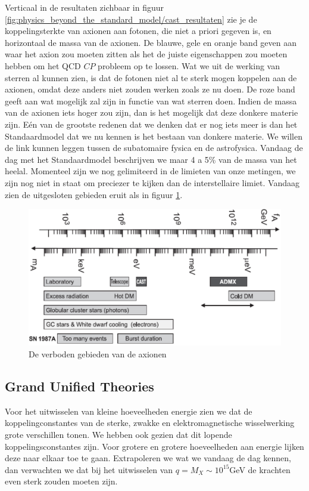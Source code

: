 \documentclass[../main.tex]{subfiles}
\begin{document}
Verticaal in de resultaten zichbaar in figuur \ref{fig:physics_beyond_the_standard_model/cast_resultaten} zie je de koppelingsterkte van axionen aan fotonen, die niet a priori gegeven is, en horizontaal de massa van de axionen. De blauwe, gele en oranje band geven aan waar het axion zou moeten zitten als het de juiste eigenschappen zou moeten hebben om het QCD $CP$ probleem op te lossen. Wat we uit de werking van sterren al kunnen zien, is dat de fotonen niet al te sterk mogen koppelen aan de axionen, omdat deze anders niet zouden werken zoals ze nu doen. De roze band geeft aan wat mogelijk zal zijn in functie van wat sterren doen. Indien de massa van de axionen iets hoger zou zijn, dan is het mogelijk dat deze donkere materie zijn. Eén van de grootste redenen dat we denken dat er nog iets meer is dan het Standaardmodel dat we nu kennen is het bestaan van donkere materie. We willen de link kunnen leggen tussen de subatomaire fysica en de astrofysica. Vandaag de dag met het Standaardmodel beschrijven we maar 4 a 5\% van de massa van het heelal. Momenteel zijn we nog gelimiteerd in de limieten van onze metingen, we zijn nog niet in staat om preciezer te kijken dan de interstellaire limiet. Vandaag zien de uitgesloten gebieden eruit als in figuur \ref{fig:physics_beyond_the_standard_model/axionen_verboden_gebieden}.

\begin{figure}[h]
    \centering
    \includegraphics[width=0.6\linewidth]{physics_beyond_the_standard_model/axionen_verboden_gebieden.png}
    \caption{De verboden gebieden van de axionen}%
    \label{fig:physics_beyond_the_standard_model/axionen_verboden_gebieden}
\end{figure}

\subsection{Grand Unified Theories}%
\label{sub:grand_unified_theories}

Voor het uitwisselen van kleine hoeveelheden energie zien we dat de koppelingconstantes van de sterke, zwakke en elektromagnetische wisselwerking grote verschillen tonen. We hebben ook gezien dat dit lopende koppelingsconstantes zijn. Voor grotere en grotere hoeveelheden aan energie lijken deze naar elkaar toe te gaan. Extrapoleren we wat we vandaag de dag kennen, dan verwachten we dat bij het uitwisselen van $q=M_{X} \sim 10^{15}$GeV de krachten even sterk zouden moeten zijn.
\end{document}
